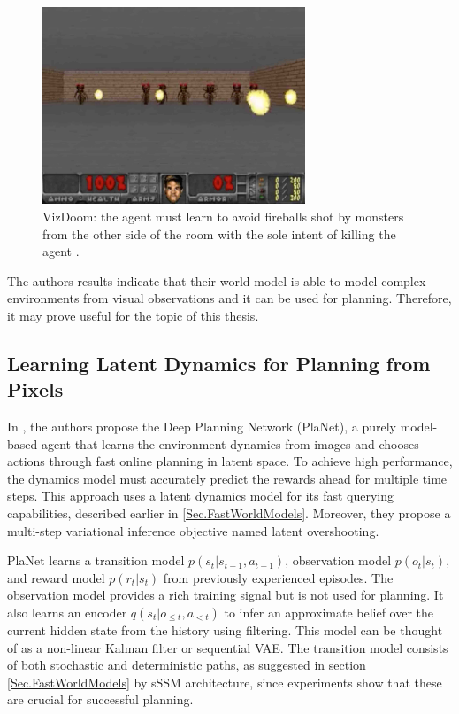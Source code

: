 \begin{figure}[H]
\includegraphics[width=0.7\textwidth,keepaspectratio]{figures/VizDoom.png}
\caption[VizDoom]{VizDoom: the agent must learn to avoid fireballs shot by monsters from the other side of the room with the sole intent of killing the agent \protect\cite{Algo.WorldModels}.}
\label{Fig.VizDoom}
\end{figure}

The authors results indicate that their world model is able to model complex environments from visual observations and it can be used for planning. Therefore, it may prove useful for the topic of this thesis.

\subsection{Learning Latent Dynamics for Planning from Pixels}

In \cite{Algo.PlaNet}, the authors propose the Deep Planning Network (PlaNet), a purely model-based agent that learns the environment dynamics from images and chooses actions through fast online planning in latent space. To achieve high performance, the dynamics model must accurately predict the rewards ahead for multiple time steps. This approach uses a latent dynamics model for its fast querying capabilities, described earlier in \ref{Sec.FastWorldModels}. Moreover, they propose a multi-step variational inference objective named latent overshooting.

PlaNet learns a transition model $p(s_t | s_{t-1}, a_{t-1})$, observation model $p(o_t | s_t)$, and reward model $p(r_t | s_t)$ from previously experienced episodes. The observation model provides a rich training signal but is not used for planning. It also learns an encoder $q(s_t | o_{\leqslant t}, a_{< t})$ to infer an approximate belief over the current hidden state from the history using filtering. This model can be thought of as a non-linear Kalman filter or sequential VAE. The transition model consists of both stochastic and deterministic paths, as suggested in section \ref{Sec.FastWorldModels} by sSSM architecture, since experiments show that these are crucial for successful planning.


